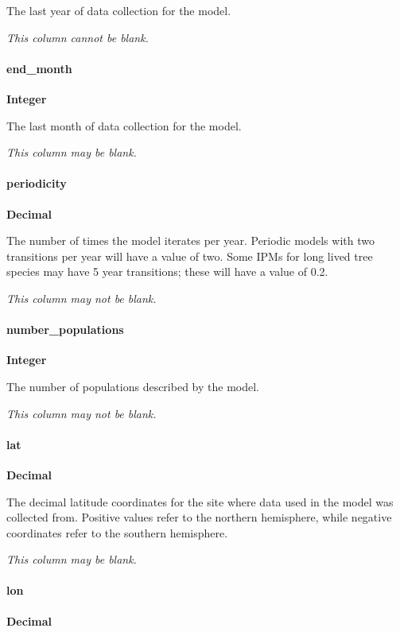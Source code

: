 \documentclass[]{article}
\let\oldparagraph\paragraph
\renewcommand{\paragraph}[1]{\oldparagraph{#1}\mbox{}}
\begin{document}
The last year of data collection for the model.

\emph{This column cannot be blank.}

\paragraph{end\_month}\label{end_month}

\textbf{Integer}

The last month of data collection for the model.

\emph{This column may be blank.}

\paragraph{periodicity}\label{periodicity}

\textbf{Decimal}

The number of times the model iterates per year. Periodic models with
two transitions per year will have a value of two. Some IPMs for long
lived tree species may have 5 year transitions; these will have a value
of 0.2.

\emph{This column may not be blank.}

\paragraph{number\_populations}\label{number_populations}

\textbf{Integer}

The number of populations described by the model.

\emph{This column may not be blank.}

\paragraph{lat}\label{lat}

\textbf{Decimal}

The decimal latitude coordinates for the site where data used in the
model was collected from. Positive values refer to the northern
hemisphere, while negative coordinates refer to the southern hemisphere.

\emph{This column may be blank.}

\paragraph{lon}\label{lon}

\textbf{Decimal}
\end{document}
